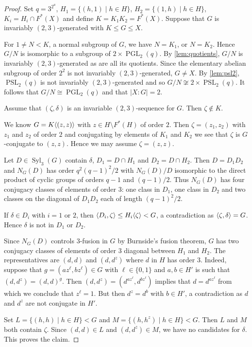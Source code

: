 \documentclass[10pt,a4paper]{amsart}
\DeclareMathOperator{\PGL}{PGL}
\DeclareMathOperator{\PSL}{PSL}
\DeclareMathOperator{\Syl}{Syl}
\DeclarePairedDelimiter{\gen}{\langle}{\rangle}
\begin{document}
\begin{proof} Set $q=3^{2^a}$,   $H_1=\{(h,1)\mid h \in H\}$, $H_2=  \{(1,h)\mid h \in H\}$, $K_i = H_i \cap F^*(X)$ and define $K=K_1K_2=F^*(X)$.
Suppose that $G$ is invariably $(2,3)$-generated with $K \le G \le X$.



 For $1\ne N<K$, a  normal subgroup of $G$, we have $N= K_1$, or $N= K_2$.  Hence $G/N$ is isomorphic to a subgroup of $2 \times \PGL_2(q)$.  By \cref{lem:quotients}, $G/N$ is invariably $(2,3)$-generated as are all its quotients. Since the elementary abelian subgroup of order $2^2$ is not invariably $(2,3)$-generated,  $G \ne X$. By  \cref{lem:psl2}, $\PSL_2(q)$ is not invariably $(2,3)$-generated and so $G/N \not \cong 2 \times \PSL_2(q)$. It follows that $G/N \cong \PGL_2(q)$ and that $|X:G|=2$.

Assume that $(\zeta,\delta)$ is an invariable $(2,3)$-sequence for $G$. Then $\zeta \not \in K$.

   We know $G = K\gen{(z,z)}$ with $z\in H\setminus F^*(H)$ of order $2$. Then $\zeta=(z_1,z_2)$ with $z_1$ and $z_2$ of order $2$ and conjugating by elements of $K_1$ and $K_2$ we see that $\zeta$ is $G$-conjugate to $(z,z)$. Hence we may assume $\zeta=(z,z)$.

      Let $D \in \Syl_3(G)$ contain $\delta$, $D_1= D\cap H_1$ and $D_2=D\cap H_2$. Then $D=D_1D_2$ and $N_G(D)$ has order $q^2(q-1)^2/2$ with $N_G(D)/D$ isomorphic to the direct product of  cyclic groups of orders $q-1$ and $(q-1)/2$. Thus $N_G(D  )$ has four conjugacy classes of elements of order $3$: one class in $D_1$, one class in $D_2$ and two classes on the diagonal of $D_1D_2$ each of length $(q-1)^2/2$.


      If $\delta \in D_i$ with $i=1$ or $2$,  then $\langle D_i,\zeta \rangle \le H_i\gen{\zeta} < G$, a contradiction as $\gen{\zeta,\delta}= G$.   Hence $\delta$ is not in $D_1$ or $D_2$.

      Since $N_G(D)$ controls $3$-fusion in $G$ by Burnside's fusion theorem, $G$ has two conjugacy classes of elements of order $3$  diagonal between $H_1$ and $H_2$. The representatives are $(d,d)$ and $(d,d^z)$ where $d$ in $H$ has order $3$. Indeed, suppose that $g=(az^\ell,bz^\ell) \in G$ with $\ell \in \{0,1\}$ and $a,b \in H'$ is such that $(d,d^z)=(d,d)^g$.
      Then $(d,d^z) = (d^{az^\ell},d^{bz^\ell})$ implies that $d= d^{az^\ell}$ from which we conclude that $z^{\ell}=1$. But then $d^z=d^b$ with $b \in H'$, a contradiction as $d$ and $d^z$ are not conjugate in $H'$.

   Set $L= \{(h,h) \mid h \in H\}< G$ and $M= \{(h,h^z) \mid h \in H\}<G$. Then $L$ and $M$ both contain $\zeta $. Since $(d,d) \in L$ and $(d,d^z) \in M$, we have no candidates for $\delta$. This proves the claim.
\end{proof}
\end{document}
